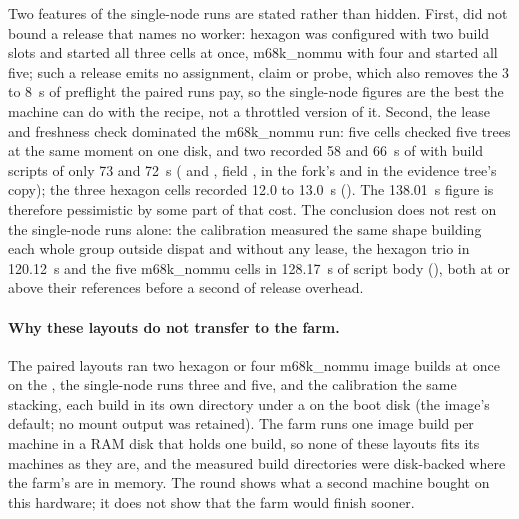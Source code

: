 Two features of the single-node runs are stated rather than hidden. First,
 did not bound a release that names no worker:
hexagon was configured with two build slots and started all three cells at
once, m68k\_nommu with four and started all five; such a release emits no
assignment, claim or probe, which also removes the 3 to 8~s of preflight the
paired runs pay, so the single-node figures are the best the machine can do
with the recipe, not a throttled version of it. Second, the lease and
freshness check dominated the m68k\_nommu run: five cells checked five trees
at the same moment on one disk, and two recorded 58 and 66~s of
 with build scripts of only 73 and 72~s
(
and , field
, in the fork's
 and in the evidence tree's copy); the three hexagon
cells recorded 12.0
to 13.0~s (). The 138.01~s figure is therefore pessimistic
by some part of that cost. The conclusion does not rest on the single-node
runs alone: the calibration measured the same shape building each whole group
outside dispat and without any lease, the hexagon trio in 120.12~s and the
five m68k\_nommu cells in 128.17~s of script body
(), both at or above their references before a second of
release overhead.

\paragraph{Why these layouts do not transfer to the farm.} The paired
layouts ran two hexagon or four m68k\_nommu image builds at once on the
, the single-node runs three and five, and the
calibration the same stacking, each build in its own directory under a
 on the boot disk (the image's default; no mount output was
retained). The farm runs one image build per machine in a RAM disk that holds
one build, so none of these layouts fits its machines as they are, and the
measured build directories were disk-backed where the farm's are in memory.
The round shows what a second machine bought on this hardware; it does not
show that the farm would finish sooner.

